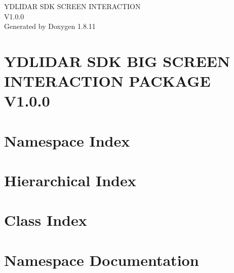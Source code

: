 \documentclass[twoside]{book}
\newcommand{\+}{\discretionary{\mbox{\scriptsize$\hookleftarrow$}}{}{}}
\newcommand{\clearemptydoublepage}{%
  \newpage{\pagestyle{empty}\cleardoublepage}%
}
\begin{document}
\hypersetup{pageanchor=false,
             bookmarksnumbered=true,
             pdfencoding=unicode
            }
\begin{titlepage}
\vspace*{7cm}
\begin{center}%
{\Large Y\+D\+L\+I\+D\+AR S\+DK S\+C\+R\+E\+EN I\+N\+T\+E\+R\+A\+C\+T\+I\+ON \\[1ex]\large V1.\+0.\+0 }\\
\vspace*{1cm}
{\large Generated by Doxygen 1.8.11}\\
\end{center}
\end{titlepage}
\clearemptydoublepage
\tableofcontents
\clearemptydoublepage
{}
\hypersetup{pageanchor=true}

\chapter{Y\+D\+L\+I\+D\+AR S\+DK B\+IG S\+C\+R\+E\+EN I\+N\+T\+E\+R\+A\+C\+T\+I\+ON P\+A\+C\+K\+A\+GE V1.0.0}
\label{md__home_yang_tmp_sdk_README}
\hypertarget{md__home_yang_tmp_sdk_README}{}

\chapter{Namespace Index}

\chapter{Hierarchical Index}

\chapter{Class Index}

\chapter{Namespace Documentation}

\end{document}
